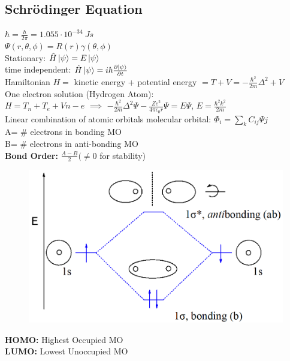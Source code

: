 \documentclass[9pt]{article}
\begin{document}
\begin{multicols}{2}
\subsection{Schrödinger Equation}
$\hbar = \frac{h}{2\pi}=1.055\cdot 10^{-34}\ Js$\\
$\Psi(r,\theta, \phi)=R(r)\gamma(\theta,\phi)$\\
Stationary: $\hat{H}\ket{\psi}=E\ket{\psi}$\\
	time independent: $\hat{H}\ket{\psi}=i \hbar \frac{\partial \ket{\psi}}{\partial t}$\\
Hamiltonian $H=$ kinetic energy + potential energy $= T+V=-\frac{\hbar ^2}{2m} \Delta ^2+V$\\
One electron solution (Hydrogen Atom):\\
$H=T_n + T_e+V{n-e}$ $\implies$ $-\frac{\hbar ^2}{2m}\Delta ^2 \Psi - \frac{Z e^2}{4 \pi \epsilon_0 r}\Psi=E\Psi$, $E=\frac{\hbar ^2 k^2}{2m}$\\
Linear combination of atomic orbitals molecular orbital: $\Phi _i= \sum_{k} C_{ij} \Psi{j}$\\
A= \# electrons in bonding MO\\
B= \# electrons in anti-bonding MO\\
\textbf{Bond Order: } $\frac{A-B}{2} (\neq 0$ for stability)\\
\begin{figure}
	\vspace{-15pt}
		\includegraphics[width=0.9\linewidth]{Images/bonding_antibonding.png}\\
	\end{figure}

\textbf{HOMO:} Highest Occupied MO\\
\textbf{LUMO:} Lowest Unoccupied MO\\\\\\

\end{multicols}
\end{document}
